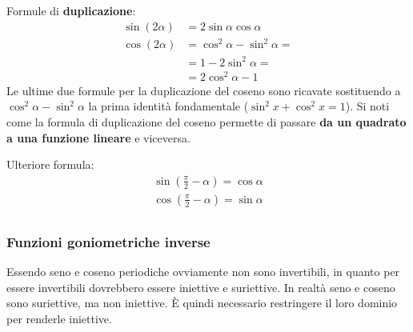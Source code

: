 Formule di \textbf{duplicazione}:\label{formuleDuplicazione}
\begin{align*}
    \sin(2\alpha) &= 2\sin{\alpha}\cos{\alpha}\\
    \cos(2\alpha) &= \cos^2{\alpha} - \sin^2{\alpha} =\\
    &= 1 - 2\sin^2{\alpha} = \\
    &= 2\cos^2{\alpha} - 1
\end{align*}
Le ultime due formule per la duplicazione del coseno sono ricavate sostituendo a $\cos^2{\alpha} - \sin^2{\alpha}$ la prima identità fondamentale ($\sin^2{x} + \cos^2{x} = 1$). Si noti come la formula di duplicazione del coseno permette di passare \textbf{da un quadrato a una funzione lineare} e viceversa.

Ulteriore formula:
\begin{gather*}
    \sin\left(\frac{\pi}{2}-\alpha\right) = \cos{\alpha}\\
    \cos\left(\frac{\pi}{2}-\alpha\right) = \sin{\alpha}\\
\end{gather*}

\subsubsection{Funzioni goniometriche inverse}

Essendo seno e coseno periodiche ovviamente non sono invertibili, in quanto per essere invertibili dovrebbero essere iniettive e suriettive. In realtà seno e coseno sono suriettive, ma non iniettive. È quindi necessario restringere il loro dominio per renderle iniettive.


